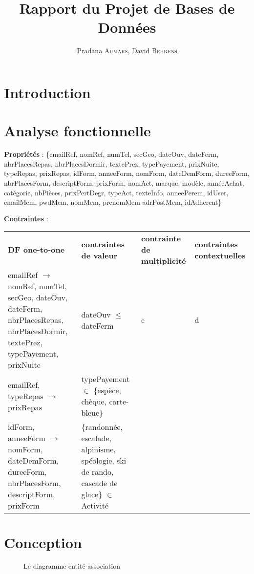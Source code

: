 \documentclass[12pt, a4paper]{article}
\title{Rapport du Projet de Bases de Données}
\author{Pradana \textsc{Aumars}, David \textsc{Behrens}}
\begin{document}
\maketitle
\section{Introduction}
\section{Analyse fonctionnelle}
\textbf{Propriétés} : \{emailRef, nomRef, numTel, secGeo, dateOuv, dateFerm, nbrPlacesRepas, nbrPlacesDormir, textePrez, typePayement, prixNuite, typeRepas, prixRepas, idForm, anneeForm, nomForm, dateDemForm, dureeForm, nbrPlacesForm, descriptForm, prixForm, nomAct, marque, modèle, annéeAchat, catégorie, nbPièces, prixPertDegr, typeAct, texteInfo, anneePerem, idUser, emailMem, pwdMem, nomMem, prenomMem adrPostMem, idAdherent\}

\textbf{Contraintes} :
\begin{table}[h]
\scriptsize
\begin{tabular}{llll}
  \textbf{DF one-to-one} & \textbf{contraintes de valeur} & \textbf{contrainte de multiplicité} & \textbf{contraintes contextuelles} \\
  
  emailRef $\rightarrow$ nomRef, numTel, secGeo, dateOuv, dateFerm, nbrPlacesRepas, nbrPlacesDormir, textePrez, typePayement, prixNuite & dateOuv $\leq$ dateFerm & c & d \\
  
  emailRef, typeRepas $\rightarrow$ prixRepas & typePayement $\in$ \{espèce, chèque, carte-bleue\} & & \\
  
  idForm, anneeForm $\rightarrow$ nomForm, dateDemForm, dureeForm, nbrPlacesForm, descriptForm, prixForm & \{randonnée, escalade, alpinisme, spéologie, ski de rando, cascade de glace\} $\in$ Activité & & \\
  
  
  
  
\end{tabular}
\end{table}
\section{Conception}
\begin{figure}[h]

\caption{Le diagramme entité-association}
\end{figure}
\end{document}
